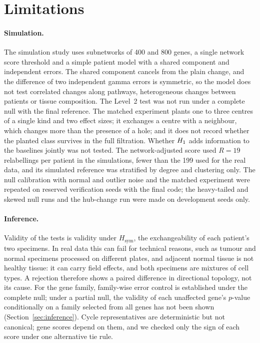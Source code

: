 \section{Limitations}\label{sec:limitations}

\paragraph{Simulation.} The simulation study uses subnetworks of 400 and 800 genes, a single network score threshold and a simple patient model with a shared component and independent errors. The shared component cancels from the plain change, and the difference of two independent gamma errors is symmetric, so the model does not test correlated changes along pathways, heterogeneous changes between patients or tissue composition. The Level~2 test was not run under a complete null with the final reference. The matched experiment plants one to three centres of a single kind and two effect sizes; it exchanges a centre with a neighbour, which changes more than the presence of a hole; and it does not record whether the planted class survives in the full filtration. Whether $H_{1}$ adds information to the baselines jointly was not tested. The network-adjusted score used $R=19$ relabellings per patient in the simulations, fewer than the 199 used for the real data, and its simulated reference was stratified by degree and clustering only. The null calibration with normal and outlier noise and the matched experiment were repeated on reserved verification seeds with the final code; the heavy-tailed and skewed null runs and the hub-change run were made on development seeds only.

\paragraph{Inference.} Validity of the tests is validity under $H_{\mathrm{sym}}$, the exchangeability of each patient's two specimens. In real data this can fail for technical reasons, such as tumour and normal specimens processed on different plates, and adjacent normal tissue is not healthy tissue: it can carry field effects, and both specimens are mixtures of cell types. A rejection therefore shows a paired difference in directional topology, not its cause. For the gene family, family-wise error control is established under the complete null; under a partial null, the validity of each unaffected gene's $p$-value conditionally on a family selected from all genes has not been shown (Section~\ref{sec:inference}). Cycle representatives are deterministic but not canonical; gene scores depend on them, and we checked only the sign of each score under one alternative tie rule.

